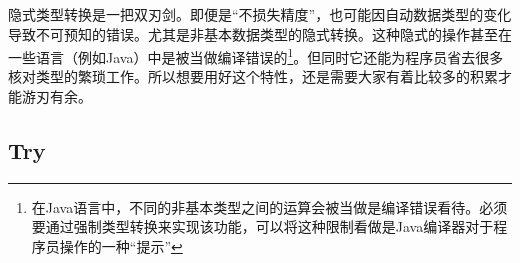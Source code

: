 隐式类型转换是一把双刃剑。即便是“不损失精度”，也可能因自动数据类型的变化导致不可预知的错误。尤其是非基本数据类型的隐式转换。这种隐式的操作甚至在一些语言（例如Java）中是被当做编译错误的\footnote{在Java语言中，不同的非基本类型之间的运算会被当做是编译错误看待。必须要通过强制类型转换来实现该功能，可以将这种限制看做是Java编译器对于程序员操作的一种“提示”}。但同时它还能为程序员省去很多核对类型的繁琐工作。所以想要用好这个特性，还是需要大家有着比较多的积累才能游刃有余。

\subsection{Try}

